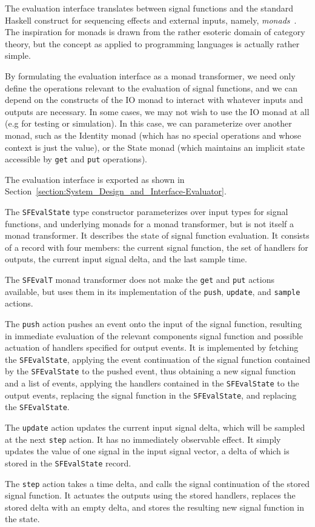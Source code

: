 The evaluation interface translates between signal functions and the standard
Haskell construct for sequencing effects and external inputs, namely,
{\em monads}~\cite{PeytonJones1993}. The inspiration for monads is drawn from
the rather esoteric domain of category theory, but the concept as applied to
programming languages is actually rather simple.

By formulating
the evaluation interface as a monad transformer, we need only define the
operations relevant to the evaluation of signal functions, and we can depend
on the constructs of the IO monad to interact with whatever inputs and outputs
are necessary. In some cases, we may not wish to use the IO monad at all (e.g
for testing or simulation). In this case, we can parameterize over another
monad, such as the Identity monad (which has no special operations and whose
context is just the value), or the State monad (which maintains an implicit 
state accessible by {\tt get} and {\tt put} operations).

The evaluation interface is exported as shown in
Section~\ref{section:System_Design_and_Interface-Evaluator}.

The {\tt SFEvalState} type constructor parameterizes over input types for signal
functions, and underlying monads for a monad transformer, but is not itself
a monad transformer. It describes the state of signal function evaluation.
It consists of a record with four members: the current signal function,
the set of handlers for outputs, the current input signal delta, and the last
sample time.

The {\tt SFEvalT} monad transformer does not make the {\tt get} and {\tt put}
actions available, but uses them in its implementation of the {\tt push},
{\tt update}, and {\tt sample} actions.

The {\tt push} action pushes an event onto the input of the signal function,
resulting in immediate evaluation of the relevant components signal function
and possible actuation of handlers specified for output events. It is
implemented by fetching the {\tt SFEvalState}, applying the event continuation
of the signal function contained by the {\tt SFEvalState} to the pushed event,
thus obtaining a new signal function and a list of events, applying the handlers
contained in the {\tt SFEvalState} to the output events, replacing the signal
function in the {\tt SFEvalState}, and replacing the {\tt SFEvalState}.

The {\tt update} action updates the current input signal delta, which will be
sampled at the next {\tt step} action. It has no immediately observable effect.
It simply updates the value of one signal in the input signal vector, a delta
of which is stored in the {\tt SFEvalState} record.

The {\tt step} action takes a time delta, and calls the signal continuation of
the stored signal function. It actuates the outputs using the stored handlers,
replaces the stored delta with an empty delta, and stores the resulting new
signal function in the state.
